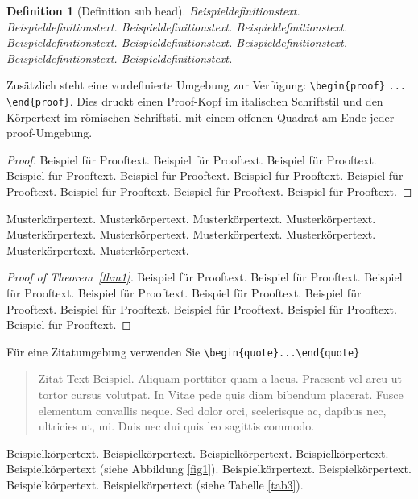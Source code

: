 \documentclass[pdflatex,sn-mathphys-num]{sn-jnl}%
\theoremstyle{thmstyleone}%
\theoremstyle{thmstyletwo}%
\theoremstyle{thmstylethree}%
\newtheorem{definition}{Definition}%
\begin{document}
\begin{definition}[Definition sub head]
Beispieldefinitionstext. Beispieldefinitionstext. Beispieldefinitionstext. Beispieldefinitionstext. Beispieldefinitionstext. Beispieldefinitionstext. Beispieldefinitionstext. Beispieldefinitionstext. Beispieldefinitionstext. 
\end{definition}

Zusätzlich steht eine vordefinierte Umgebung zur Verfügung: \verb+\begin{proof}+ \verb+...+ \verb+\end{proof}+. Dies druckt einen Proof-Kopf im italischen Schriftstil und den Körpertext im römischen Schriftstil mit einem offenen Quadrat am Ende jeder proof-Umgebung. 

\begin{proof}
Beispiel für Prooftext. Beispiel für Prooftext. Beispiel für Prooftext. Beispiel für Prooftext. Beispiel für Prooftext. Beispiel für Prooftext. Beispiel für Prooftext. Beispiel für Prooftext. Beispiel für Prooftext. Beispiel für Prooftext. 
\end{proof}

Musterkörpertext. Musterkörpertext. Musterkörpertext. Musterkörpertext. Musterkörpertext. Musterkörpertext. Musterkörpertext. Musterkörpertext. Musterkörpertext. Musterkörpertext.

\begin{proof}[Proof of Theorem~{\upshape\ref{thm1}}]
Beispiel für Prooftext. Beispiel für Prooftext. Beispiel für Prooftext. Beispiel für Prooftext. Beispiel für Prooftext. Beispiel für Prooftext. Beispiel für Prooftext. Beispiel für Prooftext. Beispiel für Prooftext. Beispiel für Prooftext. 
\end{proof}

\noindent Für eine Zitatumgebung verwenden Sie \verb+\begin{quote}...\end{quote}+
\begin{quote}
Zitat Text Beispiel. Aliquam porttitor quam a lacus. Praesent vel arcu ut tortor cursus volutpat. In Vitae pede quis diam bibendum placerat. Fusce elementum convallis neque. Sed dolor orci, scelerisque ac, dapibus nec, ultricies ut, mi. Duis nec dui quis leo sagittis commodo.
\end{quote}

Beispielkörpertext. Beispielkörpertext. Beispielkörpertext. Beispielkörpertext. Beispielkörpertext (siehe Abbildung \ref{fig1}). Beispielkörpertext. Beispielkörpertext. Beispielkörpertext. Beispielkörpertext (siehe Tabelle \ref{tab3}). 
\end{document}
